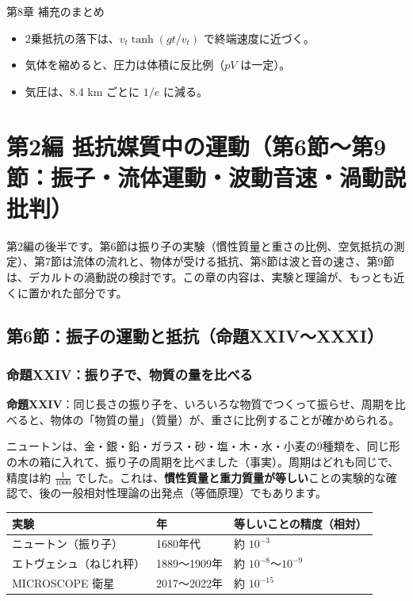 \documentclass[a4paper,11pt,openany]{ltjsbook}
\begin{document}
\begin{pointbox}{第8章 補充のまとめ}
\begin{itemize}[leftmargin=*]
\item 2乗抵抗の落下は、$v_t\tanh(gt/v_t)$ で終端速度に近づく。
\item 気体を縮めると、圧力は体積に反比例（$pV$ は一定）。
\item 気圧は、$8.4$ km ごとに $1/e$ に減る。
\end{itemize}
\end{pointbox}

\chapter{第2編 抵抗媒質中の運動（第6節〜第9節：振子・流体運動・波動音速・渦動説批判）}

第2編の後半です。第6節は振り子の実験（慣性質量と重さの比例、空気抵抗の測定）、第7節は流体の流れと、物体が受ける抵抗、第8節は波と音の速さ、第9節は、デカルトの渦動説の検討です。この章の内容は、実験と理論が、もっとも近くに置かれた部分です。

\section{第6節：振子の運動と抵抗（命題XXIV〜XXXI）}

\subsection{命題XXIV：振り子で、物質の量を比べる}

\textbf{命題XXIV}：同じ長さの振り子を、いろいろな物質でつくって振らせ、周期を比べると、物体の「物質の量」（質量）が、重さに比例することが確かめられる。

ニュートンは、金・銀・鉛・ガラス・砂・塩・木・水・小麦の9種類を、同じ形の木の箱に入れて、振り子の周期を比べました（事実）。周期はどれも同じで、精度は約 $\frac1{1000}$ でした。これは、\textbf{慣性質量と重力質量が等しい}ことの実験的な確認で、後の一般相対性理論の出発点（等価原理）でもあります。

\begin{center}
\begin{tabular}{lll}
\toprule
実験 & 年 & 等しいことの精度（相対）\\
\midrule
ニュートン（振り子） & 1680年代 & 約 $10^{-3}$\\
エトヴェシュ（ねじれ秤） & 1889〜1909年 & 約 $10^{-8}$〜$10^{-9}$\\
MICROSCOPE 衛星 & 2017〜2022年 & 約 $10^{-15}$\\
\bottomrule
\end{tabular}
\end{center}
\end{document}
